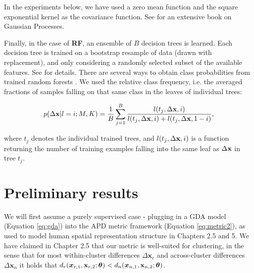 In the experiments below, we have used a zero mean function and the square exponential kernel as the covariance function. See \citep{rasmussen2005gp} for an extensive book on Gaussian Processes.

Finally, in the case of \textbf{RF}, an ensemble of $B$ decision trees is learned. Each decision tree is trained on a bootstrap resample of data (drawn with replacement), and only considering a randomly selected subset of the available features. See \citep{breiman2001random} for details. There are several ways to obtain class probabilities from trained random forests \citep{bostrom2007estimating}. We used the relative class frequency, i.e. the averaged fractions of samples falling on that same class in the leaves of individual trees:

\begin{equation}
\label{eq:rf}
p(\Delta \textbf x | l=i; M, K) = \frac{1}{B} \sum_{j=1}^{B} \frac{l(t_j, \Delta \textbf x, i)}{l(t_j, \Delta \textbf x, i)+l(t_j, \Delta \textbf x, 1-i)},
\end{equation}

where $t_j$ denotes the individual trained trees, and $l(t_j, \Delta \textbf x, i)$ is a function returning the number of training examples falling into the same leaf as $\Delta \textbf x$ in tree $t_j$.

%
%
%

\section{Preliminary results}

We will first assume a purely supervised case - plugging in a GDA model (Equation \eqref{eq:gda}) into the APD metric framework (Equation \eqref{eq:metric2}), as used to model human spatial representation structure in Chapters 2.5 and 5. We have claimed in Chapter 2.5 that our metric is well-suited for clustering, in the sense that for most within-cluster differences $\Delta \boldsymbol x_r$ and across-cluster differences $\Delta \boldsymbol x_n $ it holds that $ d_r(\boldsymbol x_{r,1}, \textbf x_{r,2}; \boldsymbol{\theta}) < d_n(\boldsymbol x_{n,1}, \textbf x_{n,2}; \boldsymbol{\theta}) $. 

